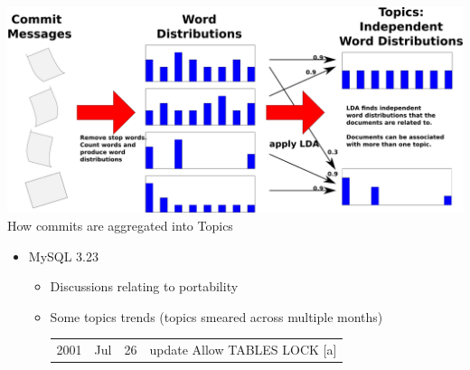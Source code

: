 \documentclass[titlepage,usenames,a4,landscape,semhelv]{seminar}
\begin{document}
\begin{slide}
\begin{itemize}
\begin{itemize}
\begin{itemize}
\begin{itemize}
\begin{specquotei}
\begin{center}
\noindent
\includegraphics[width=1.25\textwidth]{commit-to-topics} \\
{How commits are aggregated into Topics}
\end{center}
\end{specquotei}

		\end{itemize}
	\end{itemize}
\end{itemize}
\end{itemize}
\begin{itemize}
\item MySQL 3.23 
	\begin{itemize}
	\item Discussions relating to portability
	\item Some topics trends (topics smeared across multiple months)


\newslide

\begin{specquotef}
\centering
\begin{tabular}{|ccc|l|}

\hline
2001 &	Jul &	26 &		update Allow TABLES LOCK [a] \\ 


\end{tabular}
\end{specquotef}
\end{itemize}
\end{itemize}
\end{slide}
\end{document}
